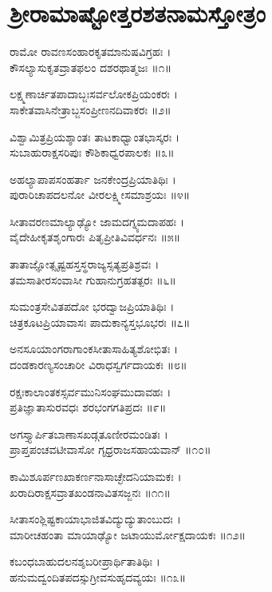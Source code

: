 
\section{ಶ್ರೀರಾಮಾಷ್ಟೋತ್ತರಶತನಾಮಸ್ತೋತ್ರಂ}

ರಾಮೋ ರಾವಣಸಂಹಾರಕೃತಮಾನುಷವಿಗ್ರಹಃ ।\\
ಕೌಸಲ್ಯಾಸುಕೃತವ್ರಾತಫಲಂ ದಶರಥಾತ್ಮಜಃ ॥೧॥

ಲಕ್ಷ್ಮಣಾರ್ಚಿತಪಾದಾಬ್ಜಃಸರ್ವಲೋಕಪ್ರಿಯಂಕರಃ ।\\
ಸಾಕೇತವಾಸಿನೇತ್ರಾಬ್ಜಸಂಪ್ರೀಣನದಿವಾಕರಃ ॥೨॥

ವಿಶ್ವಾಮಿತ್ರಪ್ರಿಯಶ್ಶಾಂತಃ ತಾಟಕಾಧ್ವಾಂತಭಾಸ್ಕರಃ ।\\
ಸುಬಾಹುರಾಕ್ಷಸರಿಪುಃ ಕೌಶಿಕಾಧ್ವರಪಾಲಕಃ ॥೩॥

ಅಹಲ್ಯಾಪಾಪಸಂಹರ್ತಾ ಜನಕೇಂದ್ರಪ್ರಿಯಾತಿಥಿಃ ।\\
ಪುರಾರಿಚಾಪದಲನೋ ವೀರಲಕ್ಷ್ಮೀಸಮಾಶ್ರಯಃ ॥೪॥

ಸೀತಾವರಣಮಾಲ್ಯಾಢ್ಯೋ ಜಾಮದಗ್ನ್ಯಮದಾಪಹಃ ।\\
ವೈದೇಹೀಕೃತಶೃಂಗಾರಃ ಪಿತೃಪ್ರೀತಿವಿವರ್ಧನಃ ॥೫॥

ತಾತಾಜ್ಞೋತ್ಸೃಷ್ಟಹಸ್ತಸ್ಥರಾಜ್ಯಸ್ಸತ್ಯಪ್ರತಿಶ್ರವಃ ।\\
ತಮಸಾತೀರಸಂವಾಸೀ ಗುಹಾನುಗ್ರಹತತ್ಪರಃ ॥೬॥

ಸುಮಂತ್ರಸೇವಿತಪದೋ ಭರದ್ವಾಜಪ್ರಿಯಾತಿಥಿಃ ।\\
ಚಿತ್ರಕೂಟಪ್ರಿಯಾವಾಸಃ ಪಾದುಕಾನ್ಯಸ್ತಭೂಭರಃ ॥೭॥

ಅನಸೂಯಾಂಗರಾಗಾಂಕಸೀತಾಸಾಹಿತ್ಯಶೋಭಿತಃ ।\\
ದಂಡಕಾರಣ್ಯಸಂಚಾರೀ ವಿರಾಧಸ್ವರ್ಗದಾಯಕಃ ॥೮॥

ರಕ್ಷಃಕಾಲಾಂತಕಸ್ಸರ್ವಮುನಿಸಂಘಮುದಾವಹಃ ।\\
ಪ್ರತಿಜ್ಞಾತಾಸುರವಧಃ ಶರಭಂಗಗತಿಪ್ರದಃ ॥೯॥

ಅಗಸ್ತ್ಯಾರ್ಪಿತಬಾಣಾಸಖಡ್ಗತೂಣೀರಮಂಡಿತಃ ।\\
ಪ್ರಾಪ್ತಪಂಚವಟೀವಾಸೋ ಗೃಧ್ರರಾಜಸಹಾಯವಾನ್ ॥೧೦॥

ಕಾಮಿಶೂರ್ಪಣಖಾಕರ್ಣನಾಸಾಚ್ಛೇದನಿಯಾಮಕಃ ।\\
ಖರಾದಿರಾಕ್ಷಸವ್ರಾತಖಂಡನಾವಿತಸಜ್ಜನಃ ॥೧೧॥

ಸೀತಾಸಂಶ್ಲಿಷ್ಟಕಾಯಾಭಾಜಿತವಿದ್ಯುದ್ಯುತಾಂಬುದಃ ।\\
ಮಾರೀಚಹಂತಾ ಮಾಯಾಢ್ಯೋ ಜಟಾಯುರ್ಮೋಕ್ಷದಾಯಕಃ ॥೧೨॥

ಕಬಂಧಬಾಹುದಲನಶ್ಶಬರೀಪ್ರಾರ್ಥಿತಾತಿಥಿಃ ।\\
ಹನುಮದ್ವಂದಿತಪದಸ್ಸುಗ್ರೀವಸುಹೃದವ್ಯಯಃ ॥೧೩॥

